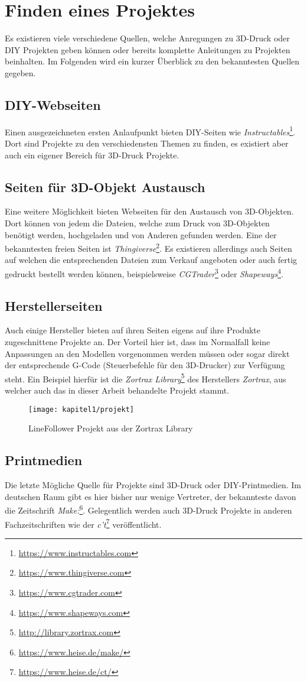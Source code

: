 \chapter{Finden eines Projektes}
Es existieren viele verschiedene Quellen, welche Anregungen zu 3D-Druck oder \ac{DIY} Projekten geben können oder bereits komplette Anleitungen zu Projekten beinhalten. Im Folgenden wird ein kurzer Überblick zu den bekanntesten Quellen gegeben.

\section{DIY-Webseiten}
Einen ausgezeichneten ersten Anlaufpunkt bieten \ac{DIY}-Seiten wie \textit{Instructables}\footnote{\url{https://www.instructables.com}}. Dort sind Projekte zu den verschiedensten Themen zu finden, es existiert aber auch ein eigener Bereich für 3D-Druck Projekte.

\section{Seiten für 3D-Objekt Austausch}
Eine weitere Möglichkeit bieten Webseiten für den Austausch von 3D-Objekten. Dort können von jedem die Dateien, welche zum Druck von 3D-Objekten benötigt werden, hochgeladen und von Anderen gefunden werden. Eine der bekanntesten freien Seiten ist \textit{Thingiverse}\footnote{\url{https://www.thingiverse.com}}. Es existieren allerdings auch Seiten auf welchen die entsprechenden Dateien zum Verkauf angeboten oder auch fertig gedruckt bestellt werden können, beispielsweise \textit{CGTrader}\footnote{\url{https://www.cgtrader.com}} oder \textit{Shapeways}\footnote{\url{https://www.shapeways.com}}.

\section{Herstellerseiten}
Auch einige Hersteller bieten auf ihren Seiten eigens auf ihre Produkte zugeschnittene Projekte an. Der Vorteil hier ist, dass im Normalfall keine Anpassungen an den Modellen vorgenommen werden müssen oder sogar direkt der entsprechende G-Code (Steuerbefehle für den 3D-Drucker) zur Verfügung steht. Ein Beispiel hierfür ist die \textit{Zortrax Library}\footnote{\url{http://library.zortrax.com}} des Herstellers \textit{Zortrax}, aus welcher auch das in dieser Arbeit behandelte Projekt stammt.

\begin{figure}[h]
  \centering
  \texttt{[image: kapitel1/projekt]}
  \caption{LineFollower Projekt aus der Zortrax Library}
  \label{Kap1:Projekt}
\end{figure}

\section{Printmedien}
Die letzte Mögliche Quelle für Projekte sind 3D-Druck oder \ac{DIY}-Printmedien. Im deutschen Raum gibt es hier bisher nur wenige Vertreter, der bekannteste davon die Zeitschrift \textit{Make:}\footnote{\url{https://www.heise.de/make/}}. Gelegentlich werden auch 3D-Druck Projekte in anderen Fachzeitschriften wie der \textit{c't}\footnote{\url{https://www.heise.de/ct/}} veröffentlicht.